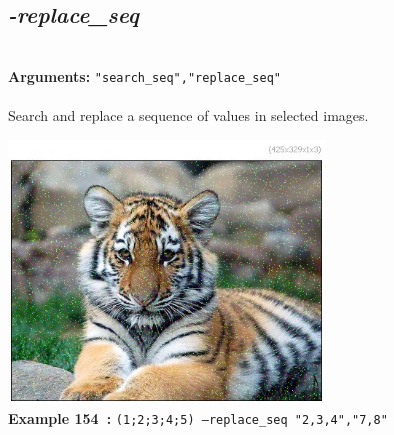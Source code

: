\documentclass[a4paper,11pt,twoside]{book}
\begin{document}
\subsection{\emph{-replace\_seq} }\vspace*{-0.5em}
~\\\textbf{Arguments: } 
{\small \texttt{"search\_seq","replace\_seq"}}\\~\\
Search and replace a sequence of values in selected images.
\begin{center}\includegraphics[keepaspectratio=true,height=7cm,width=\textwidth]{img/gmic_def154.jpg}\\
{\footnotesize \textbf{Example 154~:} \texttt{(1;2;3;4;5) --replace\_seq "2,3,4","7,8"}}
\end{center}
\end{document}
